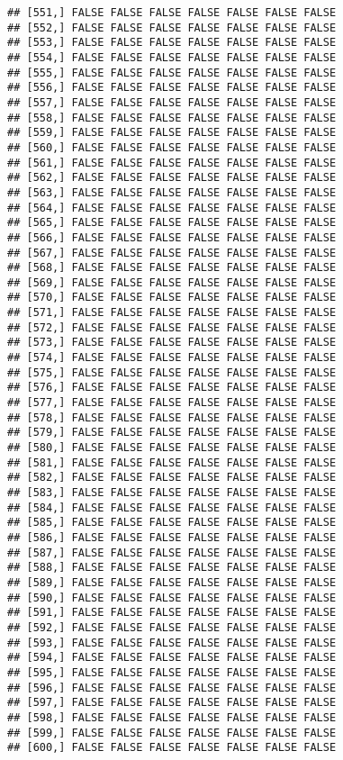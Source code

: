\documentclass[
]{article}
\begin{document}
\begin{verbatim}
## [551,] FALSE FALSE FALSE FALSE FALSE FALSE FALSE
## [552,] FALSE FALSE FALSE FALSE FALSE FALSE FALSE
## [553,] FALSE FALSE FALSE FALSE FALSE FALSE FALSE
## [554,] FALSE FALSE FALSE FALSE FALSE FALSE FALSE
## [555,] FALSE FALSE FALSE FALSE FALSE FALSE FALSE
## [556,] FALSE FALSE FALSE FALSE FALSE FALSE FALSE
## [557,] FALSE FALSE FALSE FALSE FALSE FALSE FALSE
## [558,] FALSE FALSE FALSE FALSE FALSE FALSE FALSE
## [559,] FALSE FALSE FALSE FALSE FALSE FALSE FALSE
## [560,] FALSE FALSE FALSE FALSE FALSE FALSE FALSE
## [561,] FALSE FALSE FALSE FALSE FALSE FALSE FALSE
## [562,] FALSE FALSE FALSE FALSE FALSE FALSE FALSE
## [563,] FALSE FALSE FALSE FALSE FALSE FALSE FALSE
## [564,] FALSE FALSE FALSE FALSE FALSE FALSE FALSE
## [565,] FALSE FALSE FALSE FALSE FALSE FALSE FALSE
## [566,] FALSE FALSE FALSE FALSE FALSE FALSE FALSE
## [567,] FALSE FALSE FALSE FALSE FALSE FALSE FALSE
## [568,] FALSE FALSE FALSE FALSE FALSE FALSE FALSE
## [569,] FALSE FALSE FALSE FALSE FALSE FALSE FALSE
## [570,] FALSE FALSE FALSE FALSE FALSE FALSE FALSE
## [571,] FALSE FALSE FALSE FALSE FALSE FALSE FALSE
## [572,] FALSE FALSE FALSE FALSE FALSE FALSE FALSE
## [573,] FALSE FALSE FALSE FALSE FALSE FALSE FALSE
## [574,] FALSE FALSE FALSE FALSE FALSE FALSE FALSE
## [575,] FALSE FALSE FALSE FALSE FALSE FALSE FALSE
## [576,] FALSE FALSE FALSE FALSE FALSE FALSE FALSE
## [577,] FALSE FALSE FALSE FALSE FALSE FALSE FALSE
## [578,] FALSE FALSE FALSE FALSE FALSE FALSE FALSE
## [579,] FALSE FALSE FALSE FALSE FALSE FALSE FALSE
## [580,] FALSE FALSE FALSE FALSE FALSE FALSE FALSE
## [581,] FALSE FALSE FALSE FALSE FALSE FALSE FALSE
## [582,] FALSE FALSE FALSE FALSE FALSE FALSE FALSE
## [583,] FALSE FALSE FALSE FALSE FALSE FALSE FALSE
## [584,] FALSE FALSE FALSE FALSE FALSE FALSE FALSE
## [585,] FALSE FALSE FALSE FALSE FALSE FALSE FALSE
## [586,] FALSE FALSE FALSE FALSE FALSE FALSE FALSE
## [587,] FALSE FALSE FALSE FALSE FALSE FALSE FALSE
## [588,] FALSE FALSE FALSE FALSE FALSE FALSE FALSE
## [589,] FALSE FALSE FALSE FALSE FALSE FALSE FALSE
## [590,] FALSE FALSE FALSE FALSE FALSE FALSE FALSE
## [591,] FALSE FALSE FALSE FALSE FALSE FALSE FALSE
## [592,] FALSE FALSE FALSE FALSE FALSE FALSE FALSE
## [593,] FALSE FALSE FALSE FALSE FALSE FALSE FALSE
## [594,] FALSE FALSE FALSE FALSE FALSE FALSE FALSE
## [595,] FALSE FALSE FALSE FALSE FALSE FALSE FALSE
## [596,] FALSE FALSE FALSE FALSE FALSE FALSE FALSE
## [597,] FALSE FALSE FALSE FALSE FALSE FALSE FALSE
## [598,] FALSE FALSE FALSE FALSE FALSE FALSE FALSE
## [599,] FALSE FALSE FALSE FALSE FALSE FALSE FALSE
## [600,] FALSE FALSE FALSE FALSE FALSE FALSE FALSE

\end{verbatim}
\end{document}
